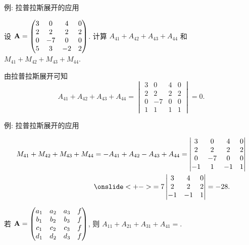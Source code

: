\begin{frame}{例: 拉普拉斯展开的应用}
	\onslide<+->
	\begin{example}
		设 ${\mathbf{A}}=\begin{pmatrix}
			3&0&4&0\\
			2&2&2&2\\
			0&-7&0&0\\
			5&3&-2&2
		\end{pmatrix}$.
		计算 $A_{41}+A_{42}+A_{43}+A_{44}$ 和 $M_{41}+M_{42}+M_{43}+M_{44}$.
	\end{example}
	\onslide<+->
	\begin{solution}
		由拉普拉斯展开可知
		\[A_{41}+A_{42}+A_{43}+A_{44}
		=\begin{vmatrix}
			3&0&4&0\\
			2&2&2&2\\
			0&-7&0&0\\
			1&1&1&1
		\end{vmatrix}=0.\]
	\end{solution}
\end{frame}


\begin{frame}{例: 拉普拉斯展开的应用}
	\onslide<+->
		\begin{solutionc}
			\vspace{-\baselineskip}
			\begin{align*}
				M_{41}+M_{42}+M_{43}+M_{44}
				&=-A_{41}+A_{42}-A_{43}+A_{44}
				=\begin{vmatrix}
					3&0&4&0\\
					2&2&2&2\\
					0&-7&0&0\\
					-1&1&-1&1
				\end{vmatrix}\\
				&\onslide<+->{=7\begin{vmatrix}
					3&4&0\\
					2&2&2\\
					-1&-1&1
				\end{vmatrix}=-28.}
		\end{align*}
	\end{solutionc}
	\onslide<+->
	\begin{exercise}
		若 ${\mathbf{A}}=\begin{pmatrix}
			a_1&a_2&a_3&f\\
			b_1&b_2&b_3&f\\
			c_1&c_2&c_3&f\\
			d_1&d_2&d_3&f
		\end{pmatrix}$,
		则 $A_{11}+A_{21}+A_{31}+A_{41}=$.
		\vspace{-.2\baselineskip}
	\end{exercise}
\end{frame}



